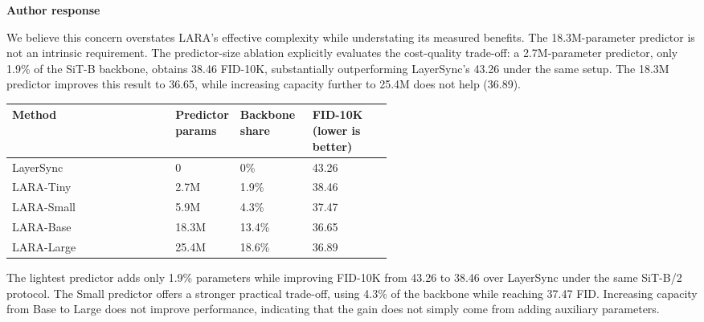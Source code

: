 \documentclass[10pt,letterpaper]{article}
\newcommand{\SectionLabel}[1]{%
  {\small\bfseries\color{blue}#1\par}\vspace{0.08em}
}
\begin{document}
\SectionLabel{Author response}

\begin{answerbox}

We believe this concern overstates LARA's effective complexity while understating its measured benefits. The 18.3M-parameter predictor is not an intrinsic requirement. The predictor-size ablation explicitly evaluates the cost-quality trade-off: a 2.7M-parameter predictor, only 1.9\% of the SiT-B backbone, obtains 38.46 FID-10K, substantially outperforming LayerSync's 43.26 under the same setup. The 18.3M predictor improves this result to 36.65, while increasing capacity further to 25.4M does not help (36.89).


\begin{cleanTable}
\small
\begin{tabularx}{\linewidth}{Y C{0.15\linewidth} C{0.19\linewidth} C{0.21\linewidth}}
\bfseries\color{white} Method & \bfseries\color{white} Predictor params & \bfseries\color{white} Backbone share & \bfseries\color{white} FID-10K (lower is better) \\
\midrule
LayerSync & 0 & 0\% & 43.26 \\
LARA-Tiny & 2.7M & 1.9\% & 38.46 \\
LARA-Small & 5.9M & 4.3\% & 37.47 \\
LARA-Base & 18.3M & 13.4\% & 36.65 \\
LARA-Large & 25.4M & 18.6\% & 36.89 \\
\end{tabularx}
\end{cleanTable}


The lightest predictor adds only 1.9\% parameters while improving FID-10K from 43.26 to 38.46 over LayerSync under the same SiT-B/2 protocol. The Small predictor offers a stronger practical trade-off, using 4.3\% of the backbone while reaching 37.47 FID. Increasing capacity from Base to Large does not improve performance, indicating that the gain does not simply come from adding auxiliary parameters.



\end{answerbox}
\end{document}
